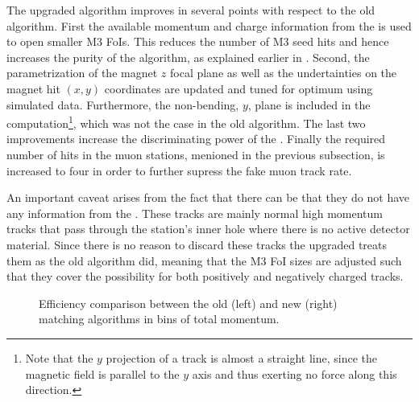 The upgraded \mvTTm algorithm improves in several points with respect to the old \mvm algorithm.
First the available momentum and charge information from the \ttracker is used to open smaller M3 FoIs.
This reduces the number of M3 seed hits and hence increases the purity of the \mvTTm algorithm,
as explained earlier in . Second, the parametrization of the magnet $z$
focal plane as well as the undertainties on the magnet hit $(x,y)$ coordinates are updated and tuned for
optimum using simulated data. Furthermore, the non-bending, $y$, plane is included in the \chisq
computation\footnote{Note that the $y$ projection of a track is almost a straight line, since the magnetic
field is parallel to the $y$ axis and thus exerting no force along this direction.}, which was not the
case in the old \mvm algorithm. The last two improvements increase the discriminating power of the \chisq.
Finally the required number of hits in the muon stations, menioned in the previous subsection, is increased
to four in order to further supress the fake muon track rate.

An important caveat arises from the fact that there can be \veloTTracks that they do not have any information from
the \ttracker. These tracks are mainly normal high momentum tracks that pass through the \ttracker station's inner hole
where there is no active detector material. Since there is no reason to discard these tracks the upgraded \mvTTm treats
them as the old \mvm algorithm did, meaning that the M3 FoI sizes are adjusted such that they cover
the possibility for both positively and negatively charged tracks.

\begin{figure}[t]
  \centering
  \begin{subfigure}{0.5\textwidth}
    \raggedright
    \scalebox{.6}{}
    \caption{}
    \label{mvTTm_eff_p}
  \end{subfigure}%
  \hfill%
  \begin{subfigure}{0.5\textwidth}
    \raggedleft
    \scalebox{.6}{}
    \caption{}
    \label{mvm_eff_p}
  \end{subfigure}
  \caption{Efficiency comparison between the old (left) and new (right) matching algorithms in bins of total momentum.}
 \label{mvm_eff_p_comp}
\end{figure}

